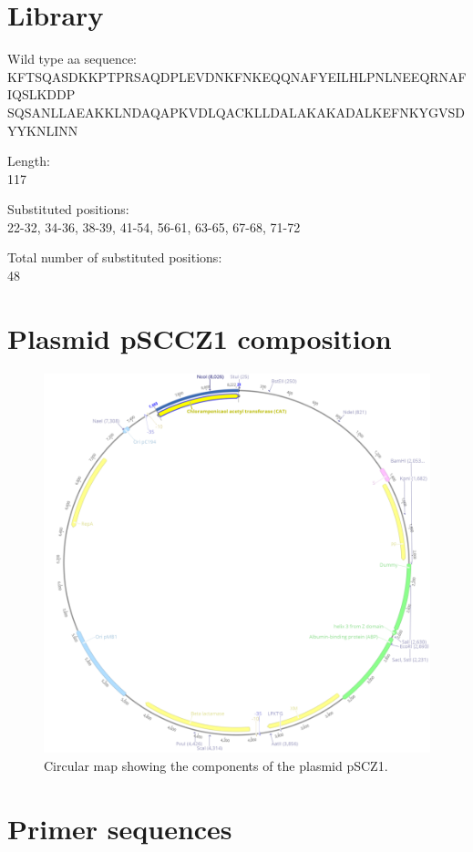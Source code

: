 \documentclass{article}
\begin{document}
	\newpage
	\appendix
	\section{Library}
	\label{lib_seq}
	Wild type aa sequence:
	\\KFTSQASDKKPTPRSAQDPLEVDNKFNKEQQNAFYEILHLPNLNEEQRNAFIQSLKDDP
	\\SQSANLLAEAKKLNDAQAPKVDLQACKLLDALAKAKADALKEFNKYGVSDYYKNLINN
	
	Length:\\117
	
	Substituted positions:\\22-32, 34-36, 38-39, 41-54, 56-61, 63-65, 67-68, 71-72
	
	Total number of substituted positions:\\48
	\newpage
	\section{Plasmid pSCCZ1 composition}
	\label{plasmid_map}

	\begin{figure}[H]
		\centering
		\includegraphics[width=0.8\linewidth]{images/dummy.png}
		\caption{Circular map showing the components of the plasmid pSCZ1.}
		\label{dummy}
	\end{figure}

	\section{Primer sequences}
	\label{primer_seq}
	
\end{document}
